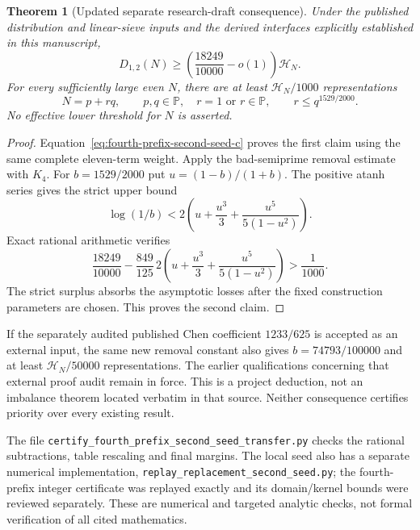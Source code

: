 \documentclass[11pt]{article}
\newtheorem{theorem}{Theorem}
\newcommand{\PP}{\mathbb P}
\newcommand{\HN}{\mathcal H_N}
\begin{document}
\begin{theorem}[Updated separate research-draft consequence]
\label{thm:fourth-prefix-second-seed-chen}
Under the published distribution and linear-sieve inputs and the
derived interfaces explicitly established in this manuscript,
\[
 D_{1,2}(N)\ge\left(\frac{18249}{10000}-o(1)\right)\HN.
\]
For every sufficiently large even $N$, there are at least $\HN/1000$
representations
\[
 N=p+rq,\qquad p,q\in\PP,\quad r=1\text{ or }r\in\PP,
 \qquad r\le q^{1529/2000}.
\]
No effective lower threshold for $N$ is asserted.
\end{theorem}

\begin{proof}
Equation~\eqref{eq:fourth-prefix-second-seed-c} proves the first
claim using the same complete eleven-term weight.
Apply the bad-semiprime removal estimate with $K_4$.
For $b=1529/2000$ put $u=(1-b)/(1+b)$.
The positive atanh series gives the strict upper bound
\[
 \log(1/b)<2\left(u+\frac{u^3}{3}
                         +\frac{u^5}{5(1-u^2)}\right).
\]
Exact rational arithmetic verifies
\[
 \frac{18249}{10000}-\frac{849}{125}\,
 2\left(u+\frac{u^3}{3}+\frac{u^5}{5(1-u^2)}\right)
 >\frac1{1000}.
\]
The strict surplus absorbs the asymptotic losses after the fixed
construction parameters are chosen. This proves the second claim.
\end{proof}

If the separately audited published Chen coefficient $1233/625$ is
accepted as an external input, the same new removal constant also
gives $b=74793/100000$ and at least $\HN/50000$ representations.
The earlier qualifications concerning that external proof audit
remain in force. This is a project deduction, not an imbalance
theorem located verbatim in that source. Neither consequence
certifies priority over every existing result.

The file \texttt{certify\_fourth\_prefix\_second\_seed\_transfer.py}
checks the rational subtractions, table rescaling and final margins.
The local seed also has a separate numerical implementation,
\texttt{replay\_replacement\_second\_seed.py}; the fourth-prefix
integer certificate was replayed exactly and its domain/kernel bounds
were reviewed separately. These are numerical and targeted analytic
checks, not formal verification of all cited mathematics.

\end{document}
